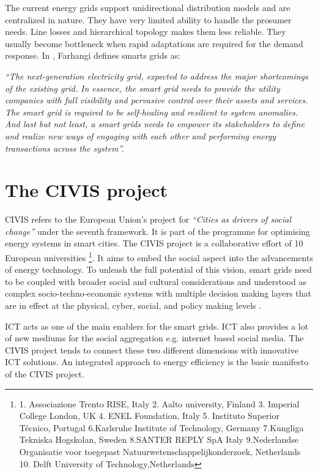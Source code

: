 The current energy grids support unidirectional distribution models and are centralized in nature.  They have very limited ability to handle the prosumer needs. Line losses and hierarchical topology makes them less reliable. They usually become bottleneck when rapid adaptations are required for the  demand response. In \cite{farhangi2010path}, Farhangi defines smarts grids as:

 \emph{``The next-generation electricity grid, expected to address the major shortcomings of the existing grid. In essence, the smart grid needs to provide the utility companies with full visibility and pervasive control over their assets and services. The smart grid is required to be self-healing and resilient to system anomalies. And last but not least, a smart grids needs to empower its stakeholders to define and realize new ways of engaging with each other and performing energy transactions across the system''.}

\section{The CIVIS project} \label{civisproject}

CIVIS refers to the European Union's project for \emph{``Cities as drivers of social change''} under the seventh framework. It is part of the programme for optimising energy systems in smart cities. The CIVIS project is a collaborative effort of 10 European universities \footnote{1. Associazione Trento RISE, Italy 2. Aalto university, Finland 3. Imperial College London, UK 4. ENEL Foundation, Italy 5. Instituto Superior Técnico, Portugal 6.Karlsruhe Institute of Technology, Germany 7.Kungliga Tekniska Hogskolan, Sweden 8.SANTER REPLY SpA Italy 9.Nederlandse Organisatie voor toegepast Natuurwetenschappelijkonderzoek, Netherlands 10. Delft University of Technology,Netherlands}. It aims to embed the social aspect into the advancements of energy technology. To unleash the full potential of this vision, smart grids need to be coupled with broader social and cultural considerations and understood as complex socio-techno-economic systems with multiple decision making layers that are in effect at the physical, cyber, social, and policy making levels \cite{civisproposal}.

ICT acts as one of the main enablers for the smart grids. ICT also provides a lot of new mediums for the social aggregation e.g. internet based social media. The CIVIS project tends to connect these two different dimensions with innovative ICT solutions. An integrated approach to energy efficiency is the basic manifesto of the CIVIS project. \cite{civisproposal}

